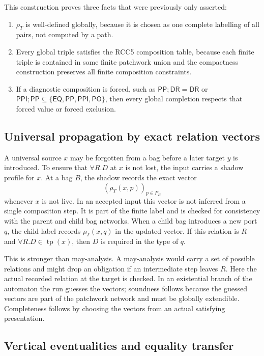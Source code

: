 \documentclass[11pt]{article}
\newcommand{\EQ}{\mathsf{EQ}}
\newcommand{\PP}{\mathsf{PP}}
\newcommand{\PPI}{\mathsf{PPI}}
\newcommand{\PO}{\mathsf{PO}}
\newcommand{\DR}{\mathsf{DR}}
\newcommand{\tp}{\operatorname{tp}}
\begin{document}
This construction proves three facts that were previously only asserted:
\begin{enumerate}[label=(P\arabic*)]
\item $\rho_T$ is well-defined globally, because it is chosen as one complete labelling of
all pairs, not computed by a path.
\item Every global triple satisfies the RCC5 composition table, because each finite
triple is contained in some finite patchwork union and the compactness construction
preserves all finite composition constraints.
\item If a diagnostic composition is forced, such as $\PP;\DR=\DR$ or $\PPI;\PP\subseteq
\{\EQ,\PP,\PPI,\PO\}$, then every global completion respects that forced value or forced
exclusion.
\end{enumerate}

\subsection{Universal propagation by exact relation vectors}

A universal source $x$ may be forgotten from a bag before a later target $y$ is
introduced.  To ensure that $\forall R.D$ at $x$ is not lost, the input carries a shadow
profile for $x$.  At a bag $B$, the shadow records the exact vector
\[
  (\rho_T(x,p))_{p\in P_B}
\]
whenever $x$ is not live.  In an accepted input this vector is not inferred from a single
composition step.  It is part of the finite label and is checked for consistency with the
parent and child bag networks.  When a child bag introduces a new port $q$, the child
label records $\rho_T(x,q)$ in the updated vector.  If this relation is $R$ and
$\forall R.D\in\tp(x)$, then $D$ is required in the type of $q$.

This is stronger than may-analysis.  A may-analysis would carry a set of possible
relations and might drop an obligation if an intermediate step leaves $R$.  Here the
actual recorded relation at the target is checked.  In an existential branch of the
automaton the run guesses the vectors; soundness follows because the guessed vectors are
part of the patchwork network and must be globally extendible.  Completeness follows by
choosing the vectors from an actual satisfying presentation.

\subsection{Vertical eventualities and equality transfer}
\end{document}
